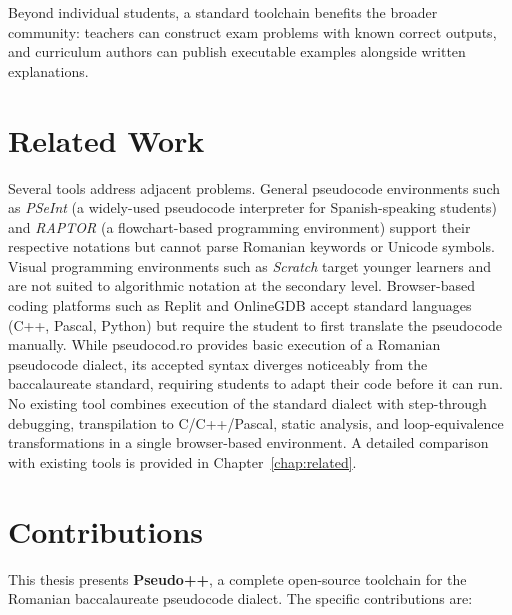 Beyond individual students, a standard toolchain benefits the broader
community: teachers can construct exam problems with known correct outputs,
and curriculum authors can publish executable examples alongside written
explanations.

\section{Related Work}
\label{sec:related-brief}

Several tools address adjacent problems.  General pseudocode environments
such as \textit{PSeInt} \cite{psint} (a widely-used pseudocode interpreter
for Spanish-speaking students) and \textit{RAPTOR} \cite{raptor}
(a flowchart-based programming environment) support their respective
notations but cannot parse Romanian keywords or Unicode symbols.
Visual programming environments such as \textit{Scratch} \cite{scratch}
target younger learners and are not suited to algorithmic notation at the
secondary level.
Browser-based coding platforms such as Replit and OnlineGDB accept standard
languages (C++, Pascal, Python) but require the student to first translate
the pseudocode manually.  While pseudocod.ro provides basic execution of a Romanian pseudocode
dialect, its accepted syntax diverges noticeably from the baccalaureate
standard, requiring students to adapt their code before it can run.
No existing tool combines execution of the standard dialect with
step-through debugging, transpilation to C/C++/Pascal, static analysis,
and loop-equivalence transformations in a single browser-based environment.
A detailed comparison with existing tools is provided in
Chapter~\ref{chap:related}.

\section{Contributions}
\label{sec:contributions}

This thesis presents \textbf{Pseudo++}, a complete open-source toolchain for
the Romanian baccalaureate pseudocode dialect.  The specific contributions
are:

